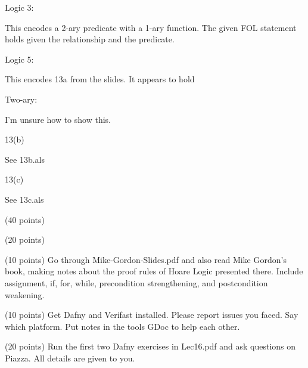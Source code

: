\documentclass[11pt]{article}
\begin{document}
\begin{compactenum}
\begin{minipage}{\minpagw}
{{      Logic 3:
      
      This encodes a 2-ary predicate with a 1-ary function. The given FOL statement holds given the relationship and the predicate.
      
      Logic 5:
      
      This encodes 13a from the slides. It appears to hold
      
      Two-ary:
      
      I'm unsure how to show this.
      
      13(b)
      
      See 13b.als
      
      13(c)
      
      See 13c.als
    }%
  }%
\end{minipage}

\item (40 points)
  \begin{compactenum}
  \item (20 points)
    \begin{compactenum}
    \item (10 points)
      Go through Mike-Gordon-Slides.pdf and also read Mike Gordon's book,
      making notes about the proof rules of Hoare Logic presented there.
      Include assignment, if, for, while, precondition
      strengthening, and postcondition weakening.

    \item (10 points)
      Get Dafny and Verifast installed. Please report issues you faced.
      Say which platform. Put notes in the tools GDoc to help each other.
    \end{compactenum}
    
  \item (20 points)
    Run the first two Dafny exercises in Lec16.pdf and ask questions
    on Piazza. All details are given to you.
  \end{compactenum}


  
\begin{minipage}{\minpagw}
\end{minipage}
\end{compactenum}
\end{document}
